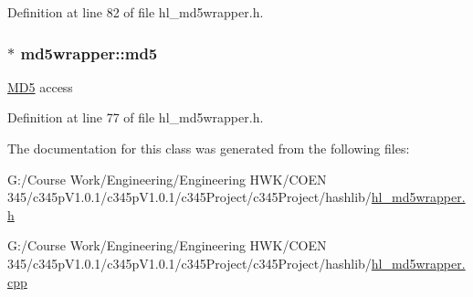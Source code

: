 Definition at line 82 of file hl\_\-md5wrapper.h.\hypertarget{classmd5wrapper_afe675f7d8993ec64ddefa902dff431fa}{
\subsubsection[{md5}]{$\ast$ {\bf md5wrapper::md5}}}
\label{classmd5wrapper_afe675f7d8993ec64ddefa902dff431fa}
\hyperlink{class_m_d5}{MD5} access 

Definition at line 77 of file hl\_\-md5wrapper.h.

The documentation for this class was generated from the following files:\begin{DoxyCompactItemize}
\item 
G:/Course Work/Engineering/Engineering HWK/COEN 345/c345pV1.0.1/c345pV1.0.1/c345Project/c345Project/hashlib/\hyperlink{hl__md5wrapper_8h}{hl\_\-md5wrapper.h}\item 
G:/Course Work/Engineering/Engineering HWK/COEN 345/c345pV1.0.1/c345pV1.0.1/c345Project/c345Project/hashlib/\hyperlink{hl__md5wrapper_8cpp}{hl\_\-md5wrapper.cpp}\end{DoxyCompactItemize}
